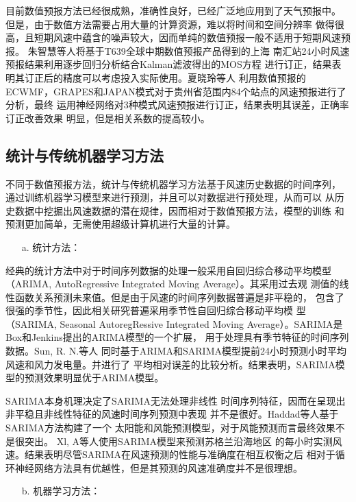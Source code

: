 \documentclass[AutoFakeBold]{LZUThesis}
\begin{document}
目前数值预报方法已经很成熟，准确性良好，已经广泛地应用到了天气预报中。
但是，由于数值方法需要占用大量的计算资源，难以将时间和空间分辨率
做得很高，且短期风速中蕴含的噪声较大，因而单纯的数值预报一般不适用于短期风速预报。
朱智慧等人将基于T639全球中期数值预报产品得到的上海
南汇站24小时风速预报结果利用逐步回归分析结合Kalman滤波得出的MOS方程
进行订正，结果表明其订正后的精度可以考虑投入实际使用。夏晓玲等人
利用数值预报的
ECWMF，GRAPES和JAPAN模式对于贵州省范围内84个站点的风速预报进行了分析，最终
运用神经网络对3种模式风速预报进行订正，结果表明其误差，正确率订正改善效果
明显，但是相关系数的提高较小。

\subsection{统计与传统机器学习方法}
不同于数值预报方法，统计与传统机器学习方法基于风速历史数据的时间序列，
通过训练机器学习模型来进行预测，并且可以对数据进行预处理，从而可以
从历史数据中挖掘出风速数据的潜在规律，因而相对于数值预报方法，模型的训练
和预测更加简单，无需使用超级计算机进行大量的计算。

\begin{itemize}
\item[a. ] 统计方法：
\end{itemize}

经典的统计方法中对于时间序列数据的处理一般采用自回归综合移动平均模型
（ARIMA, AutoRegressive Integrated Moving Average）。其采用过去观
测值的线性函数关系预测未来值。但是由于风速的时间序列数据普遍是非平稳的，
包含了很强的季节性，因此相关研究普遍采用季节性自回归综合移动平均模
型（SARIMA, Seasonal AutoregRessive Integrated 
Moving Average）。SARIMA是Box和Jenkins提出的ARIMA模型的一个扩展，
用于处理具有季节特征的时间序列数据。Sun, R. N.等人
同时基于ARIMA和SARIMA模型提前24小时预测小时平均风速和风力发电量。并进行了
平均相对误差的比较分析。结果表明，SARIMA模型的预测效果明显优于ARIMA模型。

SARIMA本身机理决定了SARIMA无法处理非线性
时间序列特征，因而在呈现出非平稳且非线性特征的风速时间序列预测中表现
并不是很好。Haddad等人基于SARIMA方法构建了一个
太阳能和风能预测模型，对于风能预测而言最终效果不是很突出。
Xl, A等人使用SARIMA模型来预测苏格兰沿海地区
的每小时实测风速。结果表明尽管SARIMA在风速预测的性能与准确度在相互权衡之后
相对于循环神经网络方法具有优越性，但是其预测的风速准确度并不是很理想。

\begin{itemize}
\item[b. ] 机器学习方法：
\end{itemize}
 
\end{document}
